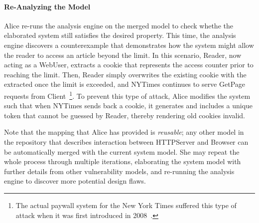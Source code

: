 \paragraph{\textbf{Re-Analyzing the Model}}

Alice re-runs the analysis engine on the merged model to check
whethe the elaborated system still satisfies the desired
property. This time, the analysis engine discovers a counterexample
that demonstrates how the system might allow the reader to access an
article beyond the limit. In this scenario, \textsf{Reader}, now
acting as a \textsf{WebUser}, extracts a
cookie that represents the access counter prior to reaching the
limit. Then, \textsf{Reader} simply overwrites the existing cookie
with the extracted once the limit is exceeded, and \textsf{NYTimes}
continues to serve \textsf{GetPage} requests from
\textsf{Client}~\footnote{The actual paywall system for the New York
  Times suffered this type of attack when it was first introduced in
  2008~\cite{nytimes-attack}.}. To prevent this type of attack, Alice
modifies the system such that when \textsf{NYTimes} sends back a
cookie, it generates and includes a unique token that cannot be
guessed by \textsf{Reader}, thereby rendering old cookies invalid.


Note that the mapping that Alice has provided is \textit{reusable};
any other model in the repository that describes interaction between
\textsf{HTTPServer} and \textsf{Browser} can be automatically merged
with the current system model. She may repeat the whole process
through multiple iterations, elaborating the system model with further
details from other vulnerability models, and re-running the analysis
engine to discover more potential design flaws.

